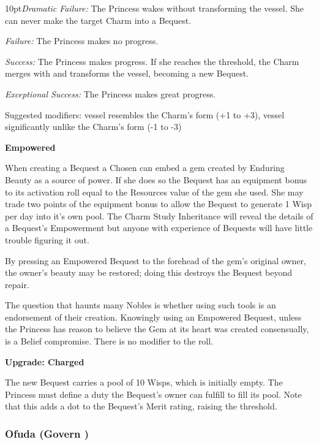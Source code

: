     \begin{myindentpar}{10pt}\emph{Dramatic Failure:} The Princess wakes without transforming the vessel. She can never make the target Charm into a Bequest.

    \emph{Failure:} The Princess makes no progress.

    \emph{Success:} The Princess makes progress. If she reaches the threshold, the Charm merges with and transforms the vessel, becoming a new Bequest.

    \emph{Exceptional Success:} The Princess makes great progress.

Suggested modifiers: vessel resembles the Charm's form (+1 to +3), vessel significantly unlike the Charm's form (-1 to -3)

\textbf{Empowered}

When creating a Bequest a Chosen can embed a gem created by Enduring Beauty as a source of power. If she does so the Bequest has an equipment bonus to its activation roll equal to the Resources value of the gem she used. She may trade two points of the equipment bonus to allow the Bequest to generate 1 Wisp per day into it's own pool. The Charm Study Inheritance will reveal the details of a Bequest's Empowerment but anyone with experience of Bequests will have little trouble figuring it out.

By pressing an Empowered Bequest to the forehead of the gem's original owner, the owner's beauty may be restored; doing this destroys the Bequest beyond repair.

The question that haunts many Nobles is whether using such tools is an endorsement of their creation. Knowingly using an Empowered Bequest, unless the Princess has reason to believe the Gem at its heart was created consensually, is a Belief compromise. There is no modifier to the roll. 

\textbf{Upgrade: Charged}

The new Bequest carries a pool of 10 Wisps, which is initially empty. The Princess must define a duty the Bequest's owner can fulfill to fill its pool. Note that this adds a dot to the Bequest's Merit rating, raising the threshold.

\end{myindentpar} 

\subsubsection*{Ofuda (Govern \textbullet\textbullet\textbullet)}

